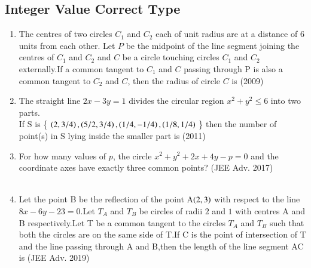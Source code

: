 \documentclass[journal,12pt,twocolumn]{IEEEtran}
\theoremstyle{remark}
\begin{document}
\subsection{Integer Value Correct Type}
\begin{enumerate}
\item The centres of two circles $C_1$ and $C_2$ each of unit radius are at a distance of $6$ units from each other. Let $P$ be the midpoint of the line segment joining the centres of $C_1$ and $C_2$ and $C$ be a circle touching circles $C_1$ and $C_2$ externally.If a common tangent to $C_1$ and $C$ passing through P is also a common tangent to $C_2$ and $C$, then the radius of circle $C$ is \hfill(2009)\\
\item The straight line $2x-3y=1$ divides the circular region $x^2+y^2\leq6$ into two parts.\\
If  S  is \{ $\left(2,3/4\right),\left(5/2,3/4\right),\left(1/4,-1/4\right),\left(1/8,1/4\right)$ \}  then the  number of point(s) in S lying inside the smaller part is \hfill(2011)\\
\item For how many values of $p$, the circle $x^2+y^2+2x+4y-p=0$ and the coordinate axes have exactly three common points? \hfill(JEE Adv. 2017)\\
\\
\item Let the point B be the reflection of the point A$\left(2,3\right)$ with respect to the line $8x-6y-23=0$.Let $T_A$ and $T_B$ be circles of radii $2$ and $1$ with centres A and B respectively.Let T be a common tangent to the circles $T_A$ and $T_B$ such that both the circles are on the same side of T.If C is the point of intersection of T and the line passing through A and B,then the length of the line segment AC is \hfill(JEE Adv. 2019)
\end{enumerate}
\end{document}
